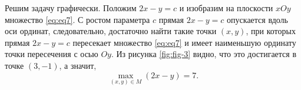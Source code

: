 Решим задачу графически. Положим $2x-y=c$ и изобразим на плоскости $xOy$ множество \ref{eq:eq7}. С ростом параметра $c$ прямая $2x-y=c$ опускается вдоль оси ординат, следовательно, достаточно найти такие точки $(x, y)$, при которых прямая $2x-y=c$ пересекает множество \ref{eq:eq7} и имеет наименьшую ординату точки пересечения с осью $Oy$. Из рисунка \ref{fig:fig-3} видно, что это достигается в точке $(3, -1)$, а значит, 
\[
\max_{(x, y) \in M}(2x-y) = 7.
\]


%


































